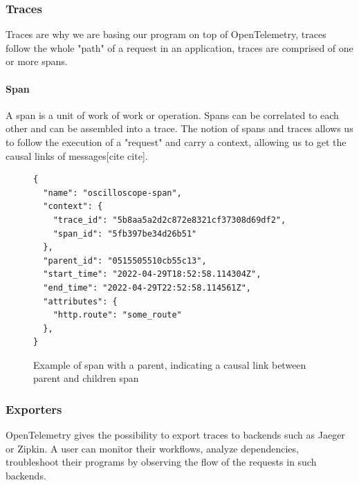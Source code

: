      \subsubsection{Traces}
        Traces are why we are basing our program on top of OpenTelemetry, traces follow the whole "path" of a request in an application, traces are comprised of one or more spans.
        \paragraph{Span} A span is a unit of work of work or operation. Spans can be correlated to each other and can be assembled into a trace.
    The notion of spans and traces allows us to follow the execution of a "request" and carry a context, allowing us to get the causal links of messages[cite cite]. %

\begin{figure}[H]
    \begin{verbatim} 
{
  "name": "oscilloscope-span",
  "context": {
    "trace_id": "5b8aa5a2d2c872e8321cf37308d69df2",
    "span_id": "5fb397be34d26b51"
  },
  "parent_id": "0515505510cb55c13",
  "start_time": "2022-04-29T18:52:58.114304Z",
  "end_time": "2022-04-29T22:52:58.114561Z",
  "attributes": {
    "http.route": "some_route"
  },
}
    \end{verbatim}
\caption{Example of span with a parent, indicating a causal link between parent and children span}
\end{figure}

    \subsubsection{Exporters}
            OpenTelemetry gives the possibility to export traces to backends such as Jaeger or Zipkin. A user can monitor their workflows, analyze dependencies, troubleshoot their programs by observing the flow of the requests in such backends. %

